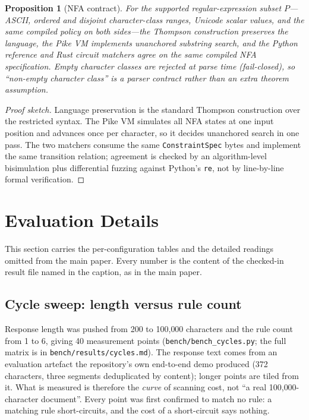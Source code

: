 \documentclass[10pt,journal,compsoc]{IEEEtran}
\newtheorem{proposition}[theorem]{Proposition}
\begin{document}
\begin{proposition}[NFA contract]
\label{prop:nfa}
For the supported regular-expression subset $P$---ASCII, ordered and disjoint
character-class ranges, Unicode scalar values, and the same compiled policy on
both sides---the Thompson construction preserves the language, the Pike VM
implements unanchored substring search, and the Python reference and Rust
circuit matchers agree on the same compiled NFA specification. Empty character
classes are rejected at parse time (fail-closed), so ``non-empty character
class'' is a parser contract rather than an extra theorem assumption.
\end{proposition}
\begin{proof}[Proof sketch]
Language preservation is the standard Thompson construction over the restricted
syntax. The Pike VM simulates all NFA states at one input position and advances
once per character, so it decides unanchored search in one pass. The two
matchers consume the same \texttt{ConstraintSpec} bytes and implement the same
transition relation; agreement is checked by an algorithm-level bisimulation
plus differential fuzzing against Python's \texttt{re}, not by line-by-line
formal verification.
\end{proof}

\section{Evaluation Details}
\label{app:eval-details}

This section carries the per-configuration tables and the detailed readings
omitted from the main paper. Every number is the content of the checked-in
result file named in the caption, as in the main paper.

\subsection{Cycle sweep: length versus rule count}
\label{sec:eval-cycles}

Response length was pushed from 200 to 100{,}000 characters and the rule count
from 1 to 6, giving 40 measurement points (\texttt{bench/bench\_cycles.py}; the
full matrix is in \texttt{bench/results/cycles.md}). The response text comes from
an evaluation artefact the repository's own end-to-end demo produced (372
characters, three segments deduplicated by content); longer points are tiled from
it. What is measured is therefore the \emph{curve} of scanning cost, not ``a real
100{,}000-character document''. Every point was first confirmed to match no rule:
a matching rule short-circuits, and the cost of a short-circuit says nothing.
\end{document}
